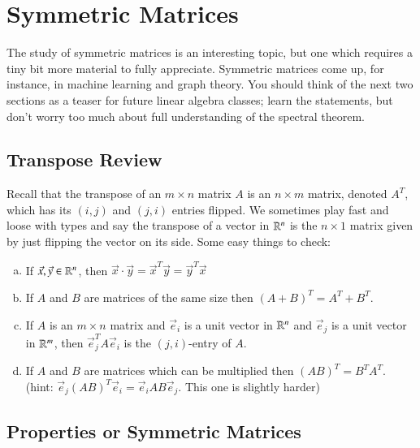 \documentclass[Main.tex]{subfiles}
\begin{document}
\exersisess

\section{Symmetric Matrices}

The study of symmetric matrices is an interesting topic, but one which requires a tiny bit more material to fully appreciate.
Symmetric matrices come up, for instance, in machine learning and graph theory.  
You should think of the next two sections as a teaser for future linear algebra classes; learn the statements, but don't worry too much about full understanding of the spectral theorem.


\subsection{Transpose Review}

Recall that the transpose of an $m\times n$ matrix $A$ is an $n\times m$ matrix, denoted $A^T$, which has its $(i,j)$ and $(j,i)$ entries flipped.
We sometimes play fast and loose with types and say the transpose of a vector in $\mathbb{R}^n$ is the $n\times 1$ matrix given by just flipping the vector on its side.
Some easy things to check:
\begin{EasyEx}
  \begin{enumerate}[a)]
    \indentitem \item If $\vec{x},\vec{y}\in\mathbb{R}^n$, then $\vec{x}\cdot\vec{y}=\vec{x}^T\vec{y}=\vec{y}^T\vec{x}$
  \item If $A$ and $B$ are matrices of the same size then $(A+B)^T=A^T+B^T$.
  \item If $A$ is an $m\times n$ matrix and $\vec{e}_i$ is a unit vector in $\mathbb{R}^n$ and $\vec{e}_j$ is a unit vector in $\mathbb{R}^m$, then $\vec{e}_j^TA\vec{e}_i$ is the $(j,i)$-entry of $A$.
  \item If $A$ and $B$ are matrices which can be multiplied then $(AB)^T=B^TA^T$.  (hint: $\vec{e}_j(AB)^T\vec{e}_i=\vec{e}_iAB\vec{e}_j$.  This one is slightly harder)
  \end{enumerate}
\end{EasyEx}

\subsection{Properties or Symmetric Matrices}
\end{document}

